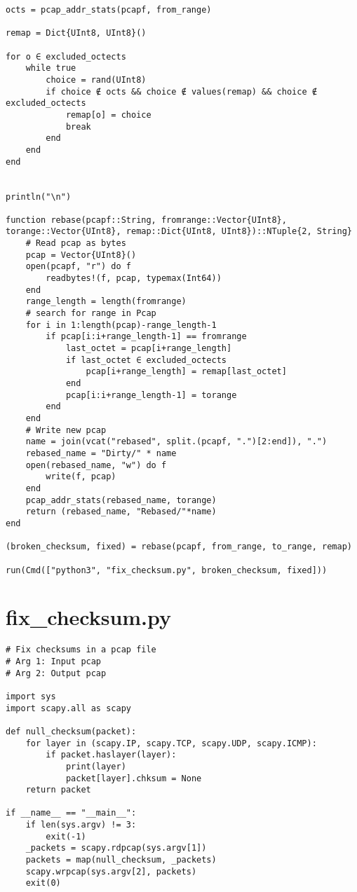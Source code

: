 \begin{lstlisting}[language=JuliaLocal, style=julia]
octs = pcap_addr_stats(pcapf, from_range)

remap = Dict{UInt8, UInt8}()

for o ∈ excluded_octects
    while true
        choice = rand(UInt8)
        if choice ∉ octs && choice ∉ values(remap) && choice ∉ excluded_octects
            remap[o] = choice
            break
        end
    end
end


println("\n")

function rebase(pcapf::String, fromrange::Vector{UInt8}, torange::Vector{UInt8}, remap::Dict{UInt8, UInt8})::NTuple{2, String}
    # Read pcap as bytes
    pcap = Vector{UInt8}()
    open(pcapf, "r") do f
        readbytes!(f, pcap, typemax(Int64))
    end
    range_length = length(fromrange)
    # search for range in Pcap
    for i in 1:length(pcap)-range_length-1
        if pcap[i:i+range_length-1] == fromrange
            last_octet = pcap[i+range_length]
            if last_octet ∈ excluded_octects
                pcap[i+range_length] = remap[last_octet]
            end
            pcap[i:i+range_length-1] = torange
        end
    end
    # Write new pcap
    name = join(vcat("rebased", split.(pcapf, ".")[2:end]), ".")
    rebased_name = "Dirty/" * name
    open(rebased_name, "w") do f
        write(f, pcap)
    end
    pcap_addr_stats(rebased_name, torange)
    return (rebased_name, "Rebased/"*name)
end

(broken_checksum, fixed) = rebase(pcapf, from_range, to_range, remap)

run(Cmd(["python3", "fix_checksum.py", broken_checksum, fixed]))
\end{lstlisting}

\section{fix\_checksum.py}
\label{sec:apdx_fix_checksum_py}

\begin{listing}[H]
    \vspace{0.5cm}
    \begin{verbatim}
# Fix checksums in a pcap file
# Arg 1: Input pcap
# Arg 2: Output pcap

import sys
import scapy.all as scapy

def null_checksum(packet):
    for layer in (scapy.IP, scapy.TCP, scapy.UDP, scapy.ICMP):
        if packet.haslayer(layer):
            print(layer)
            packet[layer].chksum = None
    return packet

if __name__ == "__main__":
    if len(sys.argv) != 3:
        exit(-1)
    _packets = scapy.rdpcap(sys.argv[1])
    packets = map(null_checksum, _packets)
    scapy.wrpcap(sys.argv[2], packets)
    exit(0) 
    \end{verbatim}
\end{listing}

